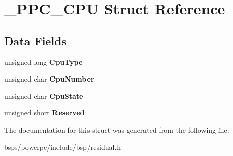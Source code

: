 \hypertarget{struct__PPC__CPU}{}\section{\+\_\+\+P\+P\+C\+\_\+\+C\+PU Struct Reference}
\label{struct__PPC__CPU}
\subsection*{Data Fields}
\begin{DoxyCompactItemize}
\item 
\mbox{\label{struct__PPC__CPU_a8905578f42e6668aa19798426f8badcf}} 
unsigned long {\bfseries Cpu\+Type}
\item 
\mbox{\label{struct__PPC__CPU_a68b3bc7e0859f4a559e751439c35576c}} 
unsigned char {\bfseries Cpu\+Number}
\item 
\mbox{\label{struct__PPC__CPU_ada0acf977d1e7e289909d6401f0a3d0a}} 
unsigned char {\bfseries Cpu\+State}
\item 
\mbox{\label{struct__PPC__CPU_affe03132e24b049dab538e6d31f0f894}} 
unsigned short {\bfseries Reserved}
\end{DoxyCompactItemize}


The documentation for this struct was generated from the following file\+:\begin{DoxyCompactItemize}
\item 
bsps/powerpc/include/bsp/residual.\+h\end{DoxyCompactItemize}
